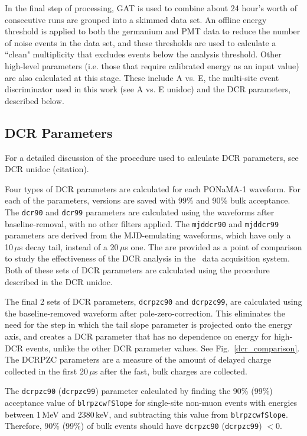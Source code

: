 \documentclass[groupedaddress,rmp,amsmath,amssymb,bibnotes,altaffilletter,twocolumn]{revtex4-1}
\begin{document}
In the final step of processing, GAT is used to combine about 24 hour's worth of consecutive runs are grouped into a skimmed data set. An offline energy threshold is applied to both the germanium and PMT data to reduce the number of noise events in the data set, and these thresholds are used to calculate a ``clean" multiplicity that excludes events below the analysis threshold. Other high-level parameters (i.e. those that require calibrated energy as an input value) are also calculated at this stage. These include A vs. E, the multi-site event discriminator used in this work (see A vs. E unidoc) and the DCR parameters, described below. 

\subsection{DCR Parameters}
For a detailed discussion of the procedure used to calculate DCR parameters, see DCR unidoc (citation). 

Four types of DCR parameters are calculated for each PONaMA-1 waveform. For each of the parameters, versions are saved with 99\% and 90\% bulk acceptance. The {\tt dcr90} and {\tt dcr99} parameters are calculated using the waveforms after baseline-removal, with no other filters applied. The {\tt mjddcr90} and {\tt mjddcr99} parameters are derived from the MJD-emulating waveforms, which have only a 10\,$\mu$s decay tail, instead of a 20\,$\mu$s one. The are provided as a point of comparison to study the effectiveness of the DCR analysis in the \MJ\ data acquisition system. Both of these sets of DCR parameters are calculated using the procedure described in the DCR unidoc. 

The final 2 sets of DCR parameters, {\tt dcrpzc90} and {\tt dcrpzc99}, are calculated using the baseline-removed waveform after pole-zero-correction. This eliminates the need for the step in which the tail slope parameter is projected onto the energy axis, and creates a DCR parameter that has no dependence on energy for high-DCR events, unlike the other DCR parameter values. See Fig.~\ref{dcr_comparison}. The DCRPZC parameters are a measure of the amount of delayed charge collected in the first 20\,$\mu$s after the fast, bulk charges are collected. 

The {\tt dcrpzc90} ({\tt dcrpzc99}) parameter calculated by finding the 90\% (99\%) acceptance value of {\tt blrpzcwfSlope} for single-site non-muon events with energies between 1\,MeV and 2380\,keV, and subtracting this value from {\tt blrpzcwfSlope}. Therefore, 90\% (99\%) of bulk events should have {\tt dcrpzc90} ({\tt dcrpzc99}) $< 0$.  
\end{document}
